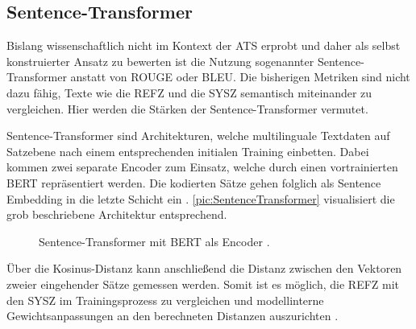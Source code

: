 \subsection{Sentence-Transformer}
\noindent
Bislang wissenschaftlich nicht im Kontext der \ac{ATS} erprobt und daher als selbst konstruierter Ansatz zu bewerten ist die Nutzung sogenannter  Sentence-Transformer anstatt von \ac{ROUGE} oder \ac{BLEU}. Die bisherigen Metriken sind nicht dazu fähig, Texte wie die \ac{REFZ} und die \ac{SYSZ} semantisch miteinander zu vergleichen. Hier werden die Stärken der Sentence-Transformer vermutet.
\newpage

\noindent
Sentence-Transformer sind Architekturen, welche multilinguale Textdaten auf Satzebene nach einem entsprechenden initialen Training einbetten. Dabei kommen zwei separate Encoder zum Einsatz, welche durch einen vortrainierten \ac{BERT} repräsentiert werden. Die kodierten Sätze gehen folglich als Sentence Embedding in die letzte Schicht ein \cite[S.~1]{FEN20}. \autoref{pic:SentenceTransformer} visualisiert die grob beschriebene Architektur entsprechend.\\

\begin{figure}[h!]
  \centering
  \caption{Sentence-Transformer mit BERT als Encoder \cite[S.~1]{FEN20}.}
  \label{pic:SentenceTransformer}
\end{figure}

\noindent
Über die Kosinus-Distanz kann anschließend die Distanz zwischen den Vektoren zweier eingehender Sätze gemessen werden. Somit ist es möglich, die \ac{REFZ} mit den \ac{SYSZ} im Trainingsprozess zu vergleichen und modellinterne Gewichtsanpassungen an den berechneten Distanzen auszurichten \cite[S.~2]{FEN20}.

